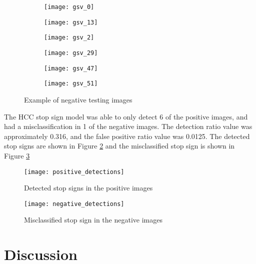 \begin{figure}[H]
  \begin{subfigure}[t]{1.5in}
    \texttt{[image: gsv\_0]}
  \end{subfigure}
  \hfill
  \begin{subfigure}[t]{1.5in}
    \texttt{[image: gsv\_13]}
  \end{subfigure}
  \hfill
  \begin{subfigure}[t]{1.5in}
    \texttt{[image: gsv\_2]}
  \end{subfigure}
  \par\medskip
  \begin{subfigure}[t]{1.5in}
    \texttt{[image: gsv\_29]}
  \end{subfigure}
  \hfill
  \begin{subfigure}[t]{1.5in}
    \texttt{[image: gsv\_47]}
  \end{subfigure}
  \hfill
  \begin{subfigure}[t]{1.5in}
    \texttt{[image: gsv\_51]}
  \end{subfigure}
  \caption{Example of negative testing images}
  \label{fig:example-gsv-negative}
\end{figure}

The HCC stop sign model was able to only detect 6 of the positive images, and had a misclassification in 1 of the negative images. The detection ratio value was approximately 0.316, and the false positive ratio value was 0.0125. The detected stop signs are shown in Figure \ref{fig:detected} and the misclassified stop sign is shown in Figure \ref{fig:misclass}

\begin{figure}[H]
  \texttt{[image: positive\_detections]}
  \caption{Detected stop signs in the positive images}
  \label{fig:detected}
\end{figure}

\begin{figure}[H]
  \texttt{[image: negative\_detections]}
  \caption{Misclassified stop sign in the negative images}
  \label{fig:misclass}
\end{figure}

\section{Discussion} \label{discussion}

